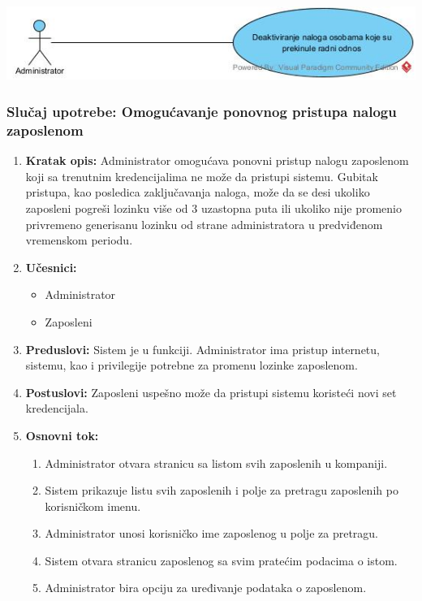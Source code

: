 \documentclass[a4paper]{article}
\begin{document}
\includegraphics[scale=0.5]{UML/SlucajUpotrebe_DeaktiviranjeNaloga.jpg}

\subsubsection{Slučaj upotrebe: Omogućavanje ponovnog pristupa nalogu zaposlenom}
\begin{enumerate}
    \item \textbf{Kratak opis:} Administrator omogućava ponovni pristup nalogu zaposlenom koji sa trenutnim kredencijalima ne može da pristupi sistemu. Gubitak pristupa, kao posledica zaključavanja naloga, može da se desi ukoliko zaposleni pogreši lozinku više od 3 uzastopna puta ili ukoliko nije promenio privremeno generisanu lozinku od strane administratora u predviđenom vremenskom periodu.
    \item \textbf{Učesnici:}
        \begin{itemize}
            \item Administrator
            \item Zaposleni
        \end{itemize}
    \item \textbf{Preduslovi:} Sistem je u funkciji. Administrator ima pristup internetu, sistemu, kao i privilegije potrebne za promenu lozinke zaposlenom.
    \item \textbf{Postuslovi:} Zaposleni uspešno može da pristupi sistemu koristeći novi set kredencijala.
    \item \textbf{Osnovni tok:}
        \begin{enumerate}
            \item Administrator otvara stranicu sa listom svih zaposlenih u kompaniji.
            \item Sistem prikazuje listu svih zaposlenih i polje za pretragu zaposlenih po korisničkom imenu.
            \item Administrator unosi korisničko ime zaposlenog u polje za pretragu.
            \item Sistem otvara stranicu zaposlenog sa svim pratećim podacima o istom.
            \item Administrator bira opciju za uređivanje podataka o zaposlenom.

\end{enumerate}
\end{enumerate}
\end{document}
